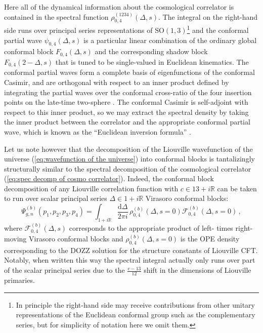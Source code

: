 \documentclass[12pt,a4paper]{article}
\newcommand\SO{\text{SO}}
\renewcommand\d{\text{d}}
\begin{document}
Here all of the dynamical information about the cosmological correlator is contained in the spectral function $\rho^{(1234)}_{0,4}(\Delta,s)$. The integral on the right-hand side runs over principal series representations of $\SO(1,3)$\footnote{In principle the right-hand side may receive contributions from other unitary representations of the Euclidean conformal group such as the complementary series, but for simplicity of notation here we omit them.} and the conformal partial wave $\psi_{0,4}(\Delta,s)$ is a particular linear combination of the ordinary global conformal block $F_{0,4}(\Delta,s)$ and the corresponding shadow block $F_{0,4}(2-\Delta,s)$ that is tuned to be single-valued in Euclidean kinematics. The conformal partial waves form a complete basis of eigenfunctions of the conformal Casimir, and are orthogonal with respect to an inner product defined by integrating the partial waves over the conformal cross-ratio of the four insertion points on the late-time two-sphere \cite{Caron-Huot:2017vep}. The conformal Casimir is self-adjoint with respect to this inner product, so we may extract the spectral density by taking the inner product between the correlator and the appropriate conformal partial wave, which is known as the ``Euclidean inversion formula'' \cite{Caron-Huot:2017vep,Karateev:2018oml}. 

Let us note however that the decomposition of the Liouville wavefunction of the universe (\ref{eq:wavefunction of the universe}) into conformal blocks is tantalizingly structurally similar to the spectral decomposition of the cosmological correlator (\ref{eq:spec decomp of cosmo correlator}). Indeed, the conformal block decomposition of any Liouville correlation function with $c\in13 + i\mathbb{R}$ can be taken to run over scalar principal series $\Delta \in 1 + i\mathbb{R}$ Virasoro conformal blocks:
\begin{equation}
    \Psi_{g,n}^{(b)}(p_1,p_2,p_3,p_4) = \int_{1+i\mathbb{R}}\frac{\d \Delta}{2\pi i}\, \rho^{(b)}_{0,4}(\Delta,s=0)\mathcal{F}^{(b)}_{0,4}(\Delta,s=0)\, ,
\end{equation}
where $\mathcal{F}^{(b)}_{0,4}(\Delta,s)$ corresponds to the appropriate product of left- times right-moving Virasoro conformal blocks and $\rho_{0,4}^{(b)}(\Delta,s=0)$ is the OPE density corresponding to the DOZZ \cite{Dorn:1994xn,Zamolodchikov:1995aa} solution for the structure constants of Liouville CFT. Notably, when written this way the spectral integral actually only runs over part of the scalar principal series due to the $\frac{c-13}{12}$ shift in the dimensions of Liouville primaries.
\end{document}
